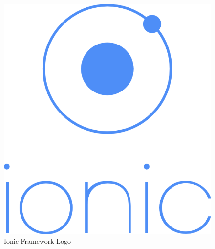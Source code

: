 \begin{figure}
  \vspace{-65pt}
  \begin{center}
    \includegraphics[scale=0.35]{Figures/ionic-logo.png}
  \end{center}
  \vspace{-10pt}
  \caption{Ionic Framework Logo}
  \label{fig:IONIC}
  \vspace{5pt}
\end{figure}

